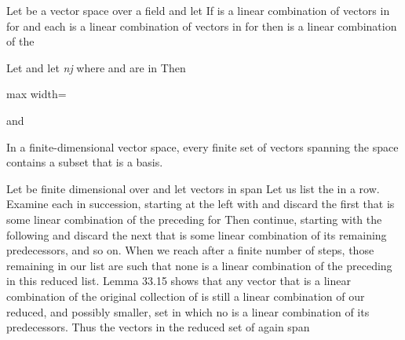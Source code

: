 \documentclass[11pt,oneside]{article}
\begin{document}
\begin{BookBody}

 Let  be a vector space over a field  and let  If \BookInline{\alpha } is a linear combination of vectors  in  for  and each  is a linear combination of vectors  in  for  then \BookInline{\alpha } is a linear combination of the 

 Let  and let \textit{nj} where  and  are in  Then

\begin{center}\begin{adjustbox}{max width=\linewidth}\end{adjustbox}\end{center}

\noindent and  \BookEnd{\blacklozenge}

 In a finite-dimensional vector space, every finite set of vectors spanning the space contains a subset that is a basis.

 Let  be finite dimensional over  and let vectors  in  span  Let us list the  in a row. Examine each  in succession, starting at the left with  and discard the first  that is some linear combination of the preceding  for  Then continue, starting with the following  and discard the next  that is some linear combination of its remaining predecessors, and so on. When we reach  after a finite number of steps, those  remaining in our list are such that none is a linear combination of the preceding  in this reduced list. Lemma 33.15 shows that any vector that is a linear combination of the original collection of  is still a linear combination of our reduced, and possibly smaller, set in which no  is a linear combination of its predecessors. Thus the vectors in the reduced set of  again span 


\end{BookBody}
\end{document}
